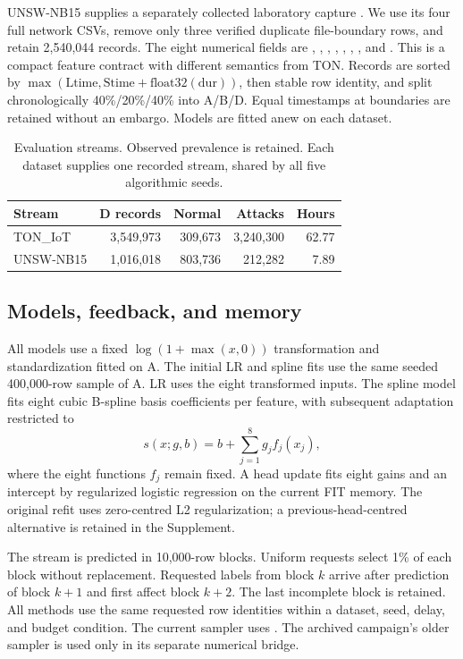 UNSW-NB15 supplies a separately collected laboratory capture \citep{moustafa2015unsw,moustafa2016unsw}. We use its four full network CSVs, remove only three verified duplicate file-boundary rows, and retain 2,540,044 records. The eight numerical fields are , , , , , , , and . This is a compact feature contract with different semantics from TON. Records are sorted by $\max(\mathrm{Ltime},\mathrm{Stime}+\mathrm{float32}(\mathrm{dur}))$, then stable row identity, and split chronologically 40\%/20\%/40\% into A/B/D. Equal timestamps at boundaries are retained without an embargo. Models are fitted anew on each dataset.

\begin{table}[tb]
\centering\small
\caption{Evaluation streams. Observed prevalence is retained. Each dataset supplies one recorded stream, shared by all five algorithmic seeds.}
\label{tab:data}
\begin{tabular}{lrrrr}
\toprule
Stream & D records & Normal & Attacks & Hours \\
\midrule
TON\_IoT & 3,549,973 & 309,673 & 3,240,300 & 62.77 \\
UNSW-NB15 & 1,016,018 & 803,736 & 212,282 & 7.89 \\
\bottomrule
\end{tabular}
\end{table}

\subsection{Models, feedback, and memory}
All models use a fixed $\log(1+\max(x,0))$ transformation and standardization fitted on A. The initial LR and spline fits use the same seeded 400,000-row sample of A. LR uses the eight transformed inputs. The spline model fits eight cubic B-spline basis coefficients per feature, with subsequent adaptation restricted to
\begin{equation}
 s(x;g,b)=b+\sum_{j=1}^{8}g_j f_j(x_j),
\end{equation}
where the eight functions $f_j$ remain fixed. A head update fits eight gains and an intercept by regularized logistic regression on the current FIT memory. The original refit uses zero-centred L2 regularization; a previous-head-centred alternative is retained in the Supplement.

The stream is predicted in 10,000-row blocks. Uniform requests select 1\% of each block without replacement. Requested labels from block $k$ arrive after prediction of block $k+1$ and first affect block $k+2$. The last incomplete block is retained. All methods use the same requested row identities within a dataset, seed, delay, and budget condition. The current sampler uses . The archived campaign's older sampler is used only in its separate numerical bridge.

